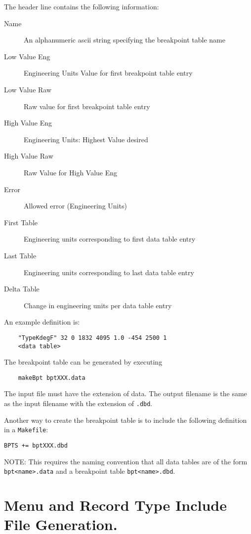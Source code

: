 The header line contains the following information:

\begin{description}
\item [Name] An alphanumeric ascii string specifying the breakpoint table name
\item [Low Value Eng] Engineering Units Value for first breakpoint table entry
\item [Low Value Raw] Raw value for first breakpoint table entry
\item [High Value Eng] Engineering Units: Highest Value desired
\item [High Value Raw] Raw Value for High Value Eng
\item [Error] Allowed error (Engineering Units)
\item [First Table] Engineering units corresponding to first data table entry
\item [Last Table] Engineering units corresponding to last data table entry
\item [Delta Table] Change in engineering units per data table entry
\end{description}

 An example definition is:

\begin{verbatim}
    "TypeKdegF" 32 0 1832 4095 1.0 -454 2500 1
    <data table>
\end{verbatim}

The breakpoint table can be generated by executing

\begin{verbatim}
    makeBpt bptXXX.data
\end{verbatim}

The input file must have the extension of data. The output filename is the same as the input filename with the extension of \verb|.dbd|.

Another way to create the breakpoint table is to include the following definition in a \verb|Makefile|:

\begin{verbatim}
BPTS += bptXXX.dbd
\end{verbatim}

NOTE: This requires the naming convention that all data tables are of the form \verb|bpt<name>.data| and a breakpoint table \verb|bpt<name>.dbd|.

\section{Menu and Record Type Include File Generation.}

